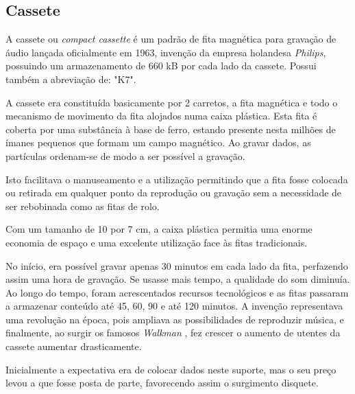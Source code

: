 \documentclass{report}
\begin{document}
		\subsection{Cassete}
		
	A cassete ou \textit{compact cassette}  é um padrão de fita magnética para gravação de áudio lançada oficialmente em 1963, invenção da empresa holandesa \textit{Philips}, possuindo um armazenamento de 660 kB por cada lado da cassete. Possui também a abreviação de: "K7".
\vspace{1mm}

	A cassete era constituída basicamente por 2 carretos, a fita magnética e todo o mecanismo de movimento da fita alojados numa caixa plástica. Esta fita é coberta por uma substância à base de ferro, estando presente nesta milhões de ímanes pequenos que formam um campo magnético. Ao gravar dados, as partículas ordenam-se de modo a ser possível a gravação.
\vspace{1mm}

	Isto facilitava o manuseamento e a utilização permitindo que a fita fosse colocada ou retirada em qualquer ponto da reprodução ou gravação sem a necessidade de ser rebobinada como as fitas de rolo. 
\vspace{1mm}
	
	Com um tamanho de 10 por 7 cm, a caixa plástica permitia uma enorme economia de espaço e uma excelente utilização face às fitas tradicionais.
\vspace{1mm}
	
	No início, era possível gravar apenas 30 minutos em cada lado da fita, perfazendo assim uma hora de gravação. Se usasse mais tempo, a qualidade do som diminuía. Ao longo do tempo, foram acrescentados recursos tecnológicos e as fitas passaram a armazenar conteúdo até 45, 60, 90 e até 120 minutos. A invenção representava uma revolução na época, pois ampliava as possibilidades de reproduzir música, e finalmente, ao surgir os famosos \textit{Walkman}  , fez crescer o aumento de utentes da cassete aumentar drasticamente.
\vspace{1mm}

	Inicialmente a expectativa era de colocar dados neste suporte, mas o seu preço levou a que fosse posta de parte, favorecendo assim o surgimento disquete.
\vspace{1mm}
		
\end{document}

